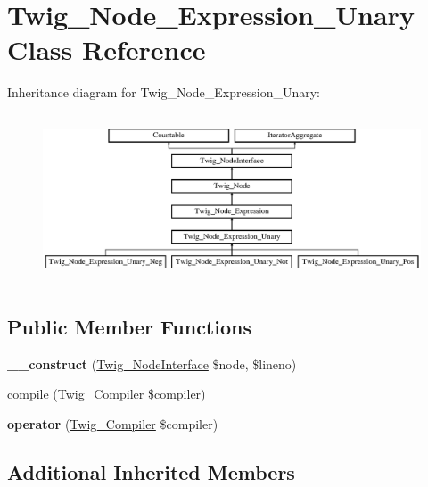 \hypertarget{classTwig__Node__Expression__Unary}{}\section{Twig\+\_\+\+Node\+\_\+\+Expression\+\_\+\+Unary Class Reference}
\label{classTwig__Node__Expression__Unary}
Inheritance diagram for Twig\+\_\+\+Node\+\_\+\+Expression\+\_\+\+Unary\+:\begin{figure}[H]
\begin{center}
\leavevmode
\includegraphics[height=5.022421cm]{classTwig__Node__Expression__Unary}
\end{center}
\end{figure}
\subsection*{Public Member Functions}
\begin{DoxyCompactItemize}
\item 
{\bfseries \+\_\+\+\_\+construct} (\hyperlink{interfaceTwig__NodeInterface}{Twig\+\_\+\+Node\+Interface} \$node, \$lineno)\hypertarget{classTwig__Node__Expression__Unary_a99b5ed20e8455f4cffa38c031c34c806}{}\label{classTwig__Node__Expression__Unary_a99b5ed20e8455f4cffa38c031c34c806}

\item 
\hyperlink{classTwig__Node__Expression__Unary_ab0b85076cfa0e7bb983684deecee6e3c}{compile} (\hyperlink{classTwig__Compiler}{Twig\+\_\+\+Compiler} \$compiler)
\item 
{\bfseries operator} (\hyperlink{classTwig__Compiler}{Twig\+\_\+\+Compiler} \$compiler)\hypertarget{classTwig__Node__Expression__Unary_a8d357d4f27ed3a0f6437ddf7849e1752}{}\label{classTwig__Node__Expression__Unary_a8d357d4f27ed3a0f6437ddf7849e1752}

\end{DoxyCompactItemize}
\subsection*{Additional Inherited Members}


